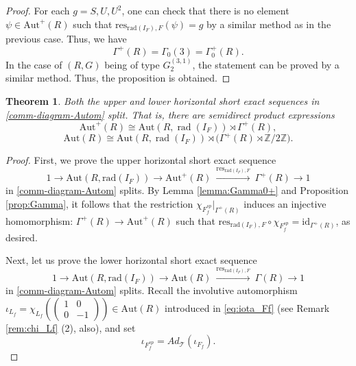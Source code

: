 \documentclass[11pt]{amsart}
\newcommand{\Z}{\mathbb{Z}}
\newtheorem{thm}{Theorem}[section]
\newcommand{\rad}{\operatorname{rad}}
\begin{document}
{{\begin{proof}
For each $g=S,U,U^2$, one can check that there is no element 
$\psi\in\mathrm{Aut}^+(R)$ such that $\mathrm{res}_{\mathrm{rad}(I_F),F}(\psi)=g$ 
by a similar method as in the previous case. Thus, we have 
\[\Gamma^+(R)=\Gamma_0(3)=\Gamma^+_0(R).\]
In the case of $(R,G)$ being of type $G_2^{(3,1)}$, the statement can be proved by 
a similar method. Thus, the proposition is obtained. 
\end{proof}
\noindent
\begin{thm}\label{thm:1}
Both the upper and lower horizontal short exact sequences in 
\eqref{comm-diagram-Autom} split.  That is, there are semidirect product 
expressions
\begin{equation}\label{eq:horizontal1}
\mathrm{Aut}^+(R)\cong\mathrm{Aut}(R,\rad (I_F))\rtimes \Gamma^+(R),
\end{equation}
\begin{equation}
\mathrm{Aut}(R)\cong \label{eq:horizontal2}
\mathrm{Aut}(R,\rad (I_F))\rtimes \big(\Gamma^+(R)\rtimes \Z/2\Z\big).
\end{equation}
\end{thm}

\begin{proof}
First, we prove the upper horizontal short exact sequence
\[1 \longrightarrow  \mathrm{Aut}(R,\mathrm{rad}(I_F)) \longrightarrow 
\mathrm{Aut}^+(R) \ \xrightarrow{\mathrm{res}_{\mathrm{rad}(I_F),F}} \ \Gamma^+(R) 
\longrightarrow  1\]
in \eqref{comm-diagram-Autom} splits. By Lemma \ref{lemma:Gamma0+} and
Proposition \ref{prop:Gamma}, it follows that the restriction 
$\chi_{F_f^{sp}}|_{\Gamma^+(R)}$ induces an injective 
homomorphism{\rm :} $\Gamma^+(R)\to \mathrm{Aut}^+(R)$ such that 
$\mathrm{res}_{\mathrm{rad}(I_F),F}\circ\chi_{F_f^{sp}}=\mathrm{id}_{\Gamma^+(R)}$,
as desired.

Next, let us prove the lower horizontal short exact sequence
\[1 \longrightarrow  \mathrm{Aut}(R,\mathrm{rad}(I_F)) \longrightarrow 
\mathrm{Aut}(R) \ \xrightarrow{\mathrm{res}_{\mathrm{rad}(I_F),F}} \ \Gamma(R) 
\longrightarrow  1\]
in \eqref{comm-diagram-Autom} splits. Recall the involutive automorphism 
$\iota_{L_f}=\chi_{L_f}\left(\begin{pmatrix}
1 & 0 \\ 0 & -1\end{pmatrix}\right)\in \mathrm{Aut}(R)$
introduced in \eqref{eq:iota_Ff} (see Remark \ref{rem:chi_Lf} (2), also), and set
\begin{equation}
\iota_{F_f^{sp}}=Ad_{\mathcal{T}}(\iota_{F_f}).
\end{equation}


\end{proof}}}
\end{document}
